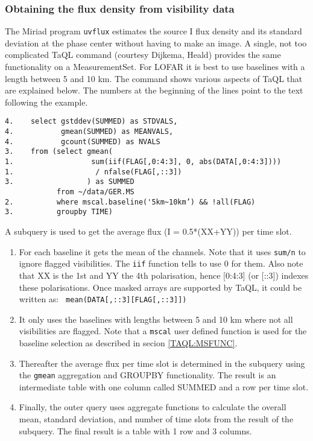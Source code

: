 \subsubsection{Obtaining the flux density from visibility data}
The Miriad program \texttt{uvflux} estimates the source I flux density and its standard deviation at the phase center without having to make an image. 
A single, not too complicated TaQL command (courtesy Dijkema, Heald)
provides the same functionality on a MeasurementSet. 
For LOFAR it is best to use baselines with a length between 5 and 10 km.
The command shows various aspects of TaQL that are explained below. 
The numbers at the beginning of the lines point to the text following
the example. 
\begin{verbatim}
4.    select gstddev(SUMMED) as STDVALS,
4.           gmean(SUMMED) as MEANVALS,
4.           gcount(SUMMED) as NVALS
3.    from (select gmean(
1.                  sum(iif(FLAG[,0:4:3], 0, abs(DATA[,0:4:3])))
1.                   / nfalse(FLAG[,::3])
3.                 ) as SUMMED
            from ~/data/GER.MS
2.          where mscal.baseline('5km~10km’) && !all(FLAG)
3.          groupby TIME)
\end{verbatim}
A subquery is used to get the average flux (I = 0.5*(XX+YY)) per time
slot.
\begin{enumerate}
\item For each baseline it gets the mean of the channels. Note that it 
  uses \texttt{sum/n} to ignore flagged visibilities. The \texttt{iif} function
  tells to use 0 for them. Also note that XX is the 1st and YY the 4th
  polarisation, hence [0:4:3] (or [::3]) indexes these polarisations. 
  Once masked arrays are supported by TaQL, it could be written as:
  \texttt{  mean(DATA[,::3][FLAG[,::3]])}
\item It only uses the baselines with lengths between 5 and 10 km
  where not all visibilities are flagged. Note that a \texttt{mscal}
  user defined function is used for the baseline selection as described
  in secion \ref{TAQL:MSFUNC}.
\item Thereafter the average flux per time slot is determined in the
  subquery using the \texttt{gmean} aggregation and GROUPBY functionality. The
  result is an intermediate table with one column called SUMMED and a row per time slot. 
\item Finally, the outer query uses aggregate functions to calculate
  the overall mean, standard deviation, and number of time slots from
  the result of the subquery. The
  final result is a table with 1 row and 3 columns. 
\end{enumerate}


